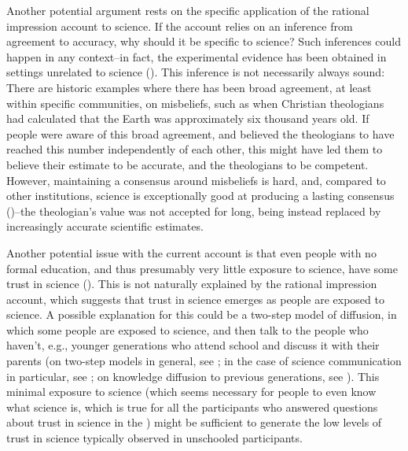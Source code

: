 \documentclass[
  jou,
  floatsintext,
  longtable,
  nolmodern,
  notxfonts,
  notimes,
  colorlinks=true,linkcolor=blue,citecolor=blue,urlcolor=blue]{apa7}
\begin{document}
Another potential argument rests on the specific application of the
rational impression account to science. If the account relies on an
inference from agreement to accuracy, why should it be specific to
science? Such inferences could happen in any context--in fact, the
experimental evidence has been obtained in settings unrelated to science
(). This inference is not necessarily always sound: There are
historic examples where there has been broad agreement, at least within
specific communities, on misbeliefs, such as when Christian theologians
had calculated that the Earth was approximately six thousand years old.
If people were aware of this broad agreement, and believed the
theologians to have reached this number independently of each other,
this might have led them to believe their estimate to be accurate, and
the theologians to be competent. However, maintaining a consensus around
misbeliefs is hard, and, compared to other institutions, science is
exceptionally good at producing a lasting consensus
()--the theologian's value was not accepted for long, being instead
replaced by increasingly accurate scientific estimates.

Another potential issue with the current account is that even people
with no formal education, and thus presumably very little exposure to
science, have some trust in science
(). This is not naturally explained by the rational
impression account, which suggests that trust in science emerges as
people are exposed to science. A possible explanation for this could be
a two-step model of diffusion, in which some people are exposed to
science, and then talk to the people who haven't, e.g., younger
generations who attend school and discuss it with their parents (on
two-step models in general, see
; in the case
of science communication in particular, see
;
on knowledge diffusion to previous generations, see
). This minimal exposure to science (which seems necessary for
people to even know what science is, which is true for all the
participants who answered questions about trust in science in the
) might be sufficient to generate the low levels of
trust in science typically observed in unschooled participants.
\end{document}
